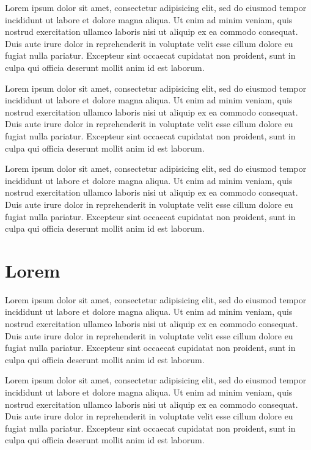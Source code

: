 \documentclass[unrestrictedsummary]{sintefreport}
\begin{document}
\label{enc:2}
Lorem ipsum dolor sit amet, consectetur adipisicing elit, sed do eiusmod tempor
incididunt ut labore et dolore magna aliqua. Ut enim ad minim veniam, quis
nostrud exercitation ullamco laboris nisi ut aliquip ex ea commodo consequat.
Duis aute irure dolor in reprehenderit in voluptate velit esse cillum dolore eu
fugiat nulla pariatur. Excepteur sint occaecat cupidatat non proident, sunt in
culpa qui officia deserunt mollit anim id est laborum.

Lorem ipsum dolor sit amet, consectetur adipisicing elit, sed do eiusmod tempor
incididunt ut labore et dolore magna aliqua. Ut enim ad minim veniam, quis
nostrud exercitation ullamco laboris nisi ut aliquip ex ea commodo consequat.
Duis aute irure dolor in reprehenderit in voluptate velit esse cillum dolore eu
fugiat nulla pariatur. Excepteur sint occaecat cupidatat non proident, sunt in
culpa qui officia deserunt mollit anim id est laborum.

Lorem ipsum dolor sit amet, consectetur adipisicing elit, sed do eiusmod tempor
incididunt ut labore et dolore magna aliqua. Ut enim ad minim veniam, quis
nostrud exercitation ullamco laboris nisi ut aliquip ex ea commodo consequat.
Duis aute irure dolor in reprehenderit in voluptate velit esse cillum dolore eu
fugiat nulla pariatur. Excepteur sint occaecat cupidatat non proident, sunt in
culpa qui officia deserunt mollit anim id est laborum.

\newpage
\appendix
\section{Lorem}
\label{app1}
Lorem ipsum dolor sit amet, consectetur adipisicing elit, sed do eiusmod tempor
incididunt ut labore et dolore magna aliqua. Ut enim ad minim veniam, quis
nostrud exercitation ullamco laboris nisi ut aliquip ex ea commodo consequat.
Duis aute irure dolor in reprehenderit in voluptate velit esse cillum dolore eu
fugiat nulla pariatur. Excepteur sint occaecat cupidatat non proident, sunt in
culpa qui officia deserunt mollit anim id est laborum.

Lorem ipsum dolor sit amet, consectetur adipisicing elit, sed do eiusmod tempor
incididunt ut labore et dolore magna aliqua. Ut enim ad minim veniam, quis
nostrud exercitation ullamco laboris nisi ut aliquip ex ea commodo consequat.
Duis aute irure dolor in reprehenderit in voluptate velit esse cillum dolore eu
fugiat nulla pariatur. Excepteur sint occaecat cupidatat non proident, sunt in
culpa qui officia deserunt mollit anim id est laborum.
\end{document}
